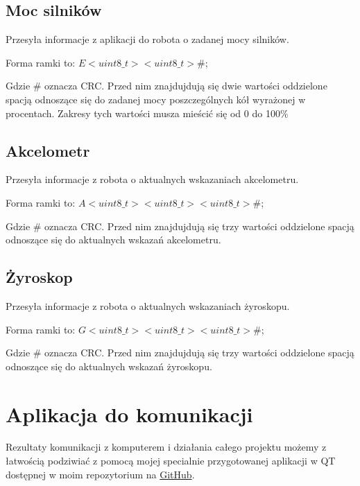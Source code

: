 \documentclass[10pt, a4paper]{article}
\begin{document}
\subsection{Moc silników}
Przesyła informacje z aplikacji do robota o zadanej mocy silników.

Forma ramki to: $E<uint8\_t> <uint8\_t>\#$;
\newline

Gdzie \# oznacza CRC. Przed nim znajdujdują się dwie wartości oddzielone spacją
odnoszące się do zadanej mocy poszczególnych kół wyrażonej w procentach.
Zakresy tych wartości musza mieścić się od 0 do 100\%



\subsection{Akcelometr}
Przesyła informacje z robota o aktualnych wskazaniach akcelometru.

Forma ramki to: $A<uint8\_t> <uint8\_t> <uint8\_t>\#$;
\newline

Gdzie \# oznacza CRC. Przed nim znajdujdują się trzy wartości oddzielone spacją
odnoszące się do aktualnych wskazań akcelometru.


\subsection{Żyroskop}
Przesyła informacje z robota o aktualnych wskazaniach żyroskopu.

Forma ramki to: $G<uint8\_t> <uint8\_t> <uint8\_t>\#$;
\newline

Gdzie \# oznacza CRC. Przed nim znajdujdują się trzy wartości oddzielone spacją
odnoszące się do aktualnych wskazań żyroskopu.


\section{Aplikacja do komunikacji}
Rezultaty komunikacji z komputerem i działania całego projektu możemy z
łatwością podziwiać z pomocą mojej specialnie przygotowanej aplikacji w QT
dostępnej w moim repozytorium na
\href{https://github.com/mbober1/RoboVision}{GitHub}.
\end{document}
